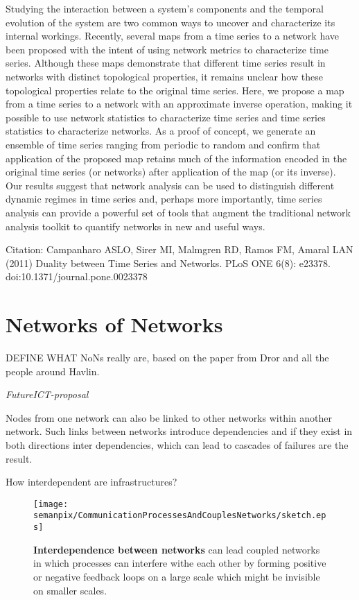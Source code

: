 \documentclass[a4paper,10pt]{scrbook}
\begin{document}
Studying the interaction between a system’s components and the temporal evolution of the system are two common ways
to uncover and characterize its internal workings. Recently, several maps from a time series to a network have been
proposed with the intent of using network metrics to characterize time series. Although these maps demonstrate that
different time series result in networks with distinct topological properties, it remains unclear how these topological
properties relate to the original time series. Here, we propose a map from a time series to a network with an approximate
inverse operation, making it possible to use network statistics to characterize time series and time series statistics to
characterize networks. As a proof of concept, we generate an ensemble of time series ranging from periodic to random and
confirm that application of the proposed map retains much of the information encoded in the original time series (or
networks) after application of the map (or its inverse). Our results suggest that network analysis can be used to distinguish
different dynamic regimes in time series and, perhaps more importantly, time series analysis can provide a powerful set of
tools that augment the traditional network analysis toolkit to quantify networks in new and useful ways.

Citation: Campanharo ASLO, Sirer MI, Malmgren RD, Ramos FM, Amaral LAN (2011) Duality between Time Series and Networks. PLoS ONE 6(8): e23378.
doi:10.1371/journal.pone.0023378



\section{Networks of Networks}


\cite{Gao2012a}



DEFINE WHAT NoNs really are, based on the paper from Dror and all the people around Havlin.

\cite{FutureICT-proposal} \textit{FutureICT-proposal}

Nodes from one network can also be linked to other networks within another network. Such links between networks introduce dependencies and if they exist in both directions inter dependencies, which can lead to cascades of failures are the result.

 How interdependent are infrastructures?

\begin{figure}[h!]
  \centering
      \texttt{[image: semanpix/CommunicationProcessesAndCouplesNetworks/sketch.eps]}
     \caption[\textbf{Interdependence between networks} leads to Networks of Networks.]{\textbf{Interdependence between networks} can lead coupled networks in which processes can interfere withe each other by forming positive or negative feedback loops on a large scale which might be invisible on smaller scales.}
     \label{fig.CPACN} 
\end{figure}
\end{document}
